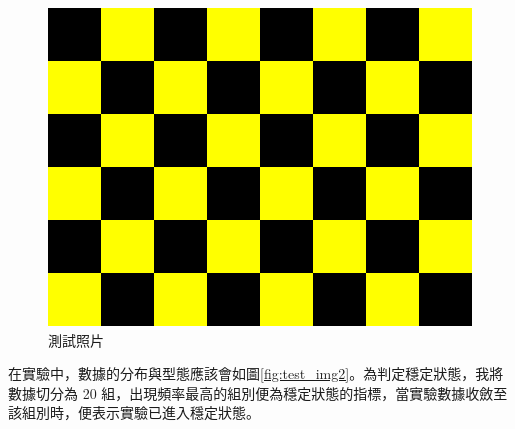 \documentclass[12pt]{article}
\begin{document}
\begin{figure}[htbp]
\begin{minipage}[b]{0.3\textwidth}
    \includegraphics[width=\textwidth]{img/blank_Yellow.png}
  \end{minipage}
  \caption{測試照片}\label{fig:test_img1}
\end{figure}

在實驗中，數據的分布與型態應該會如圖\ref{fig:test_img2}。為判定穩定狀態，我將數據切分為 20 組，出現頻率最高的組別便為穩定狀態的指標，當實驗數據收斂至該組別時，便表示實驗已進入穩定狀態。
\end{document}
